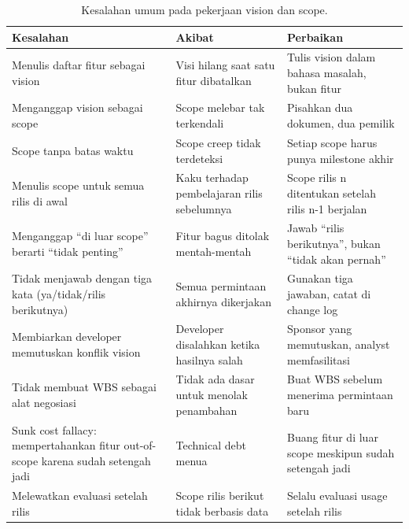 \documentclass[11pt,a4paper]{article}
\begin{document}
\begin{table}[H]
	\centering
	\caption{Kesalahan umum pada pekerjaan vision dan scope.}
	\label{tab:mistakes}
	\footnotesize
	\begin{tabularx}{\textwidth}{l X X}
		\toprule
		Kesalahan                                                                       & Akibat                                      & Perbaikan                                               \\
		\midrule
		Menulis daftar fitur sebagai vision                                             & Visi hilang saat satu fitur dibatalkan      & Tulis vision dalam bahasa masalah, bukan fitur          \\
		Menganggap vision sebagai scope                                                 & Scope melebar tak terkendali                & Pisahkan dua dokumen, dua pemilik                       \\
		Scope tanpa batas waktu                                                         & Scope creep tidak terdeteksi                & Setiap scope harus punya milestone akhir                \\
		Menulis scope untuk semua rilis di awal                                         & Kaku terhadap pembelajaran rilis sebelumnya & Scope rilis n ditentukan setelah rilis n-1 berjalan     \\
		Menganggap ``di luar scope'' berarti ``tidak penting''                          & Fitur bagus ditolak mentah-mentah           & Jawab ``rilis berikutnya'', bukan ``tidak akan pernah'' \\
		Tidak menjawab dengan tiga kata (ya/tidak/rilis berikutnya)                     & Semua permintaan akhirnya dikerjakan        & Gunakan tiga jawaban, catat di change log               \\
		Membiarkan developer memutuskan konflik vision                                  & Developer disalahkan ketika hasilnya salah  & Sponsor yang memutuskan, analyst memfasilitasi          \\
		Tidak membuat WBS sebagai alat negosiasi                                        & Tidak ada dasar untuk menolak penambahan    & Buat WBS sebelum menerima permintaan baru               \\
		Sunk cost fallacy: mempertahankan fitur out-of-scope karena sudah setengah jadi & Technical debt menua                        & Buang fitur di luar scope meskipun sudah setengah jadi  \\
		Melewatkan evaluasi setelah rilis                                               & Scope rilis berikut tidak berbasis data     & Selalu evaluasi usage setelah rilis                     \\
		\bottomrule
	\end{tabularx}
\end{table}
\end{document}
